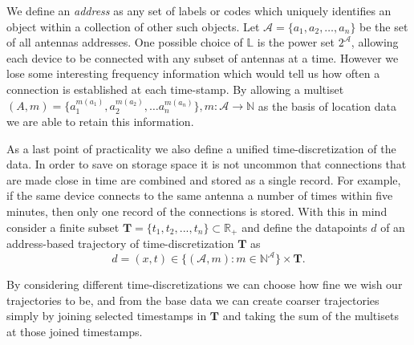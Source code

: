\documentclass[../main.tex]{subfiles}
\begin{document}
We define an \textit{address} as any set of labels or codes which uniquely identifies an object within a collection of other such objects. Let $\mathcal{A} = \{a_1, a_2, \ldots, a_n\}$ be the set of all antennas addresses. One possible choice of $\mathbb{L}$ is the power set $2^\mathcal{A}$, allowing each device to be connected with any subset of antennas at a time. However we lose some interesting frequency information which would tell us how often a connection is established at each time-stamp. By allowing a multiset $(A,m) = \{a_1^{m(a_1)},a_2^{m(a_2)},\dots a_n^{m(a_n)}\}, m:\mathcal{A} \rightarrow \mathbb{N}$ as the basis of location data we are able to retain this information.

As a last point of practicality we also define a unified time-discretization of the data. In order to save on storage space it is not uncommon that connections that are made close in time are combined and stored as a single record. For example, if the same device connects to the same antenna a number of times within five minutes, then only one record of the connections is stored. With this in mind consider a finite subset $\mathbf{T} = \{t_1, t_2, ..., t_n\} \subset \mathbb{R}_+$ and define the datapoints $d$ of an address-based trajectory of time-discretization $\mathbf{T}$ as 
$$
d = (x,t) \in \{(\mathcal{A}, m):m\in\mathbb{N}^\mathcal{A}\}\times\mathbf{T}.
$$

By considering different time-discretizations we can choose how fine we wish our trajectories to be, and from the base data we can create coarser trajectories simply by joining selected timestamps in $\mathbf{T}$ and taking the sum of the multisets at those joined timestamps.
\end{document}
